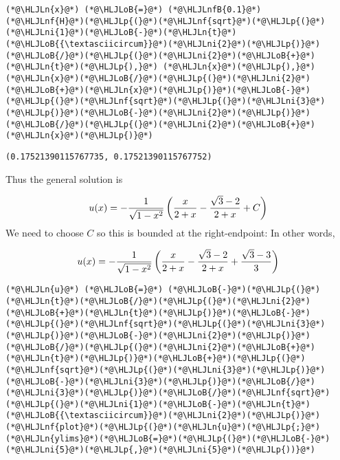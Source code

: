 \documentclass[12pt,a4paper]{article}
\newcommand{\HLJLn}[1]{#1}
\newcommand{\HLJLnf}[1]{\textcolor[RGB]{66,102,213}{#1}}
\newcommand{\HLJLnfB}[1]{\textcolor[RGB]{59,151,46}{#1}}
\newcommand{\HLJLni}[1]{\textcolor[RGB]{59,151,46}{#1}}
\newcommand{\HLJLoB}[1]{\textcolor[RGB]{102,102,102}{\textbf{#1}}}
\newcommand{\HLJLp}[1]{#1}
\begin{document}
\begin{lstlisting}
(*@\HLJLn{x}@*) (*@\HLJLoB{=}@*) (*@\HLJLnfB{0.1}@*)
(*@\HLJLnf{H}@*)(*@\HLJLp{(}@*)(*@\HLJLnf{sqrt}@*)(*@\HLJLp{(}@*)(*@\HLJLni{1}@*)(*@\HLJLoB{-}@*)(*@\HLJLn{t}@*)(*@\HLJLoB{{\textasciicircum}}@*)(*@\HLJLni{2}@*)(*@\HLJLp{)}@*)(*@\HLJLoB{/}@*)(*@\HLJLp{(}@*)(*@\HLJLni{2}@*)(*@\HLJLoB{+}@*)(*@\HLJLn{t}@*)(*@\HLJLp{),}@*) (*@\HLJLn{x}@*)(*@\HLJLp{),}@*) (*@\HLJLn{x}@*)(*@\HLJLoB{/}@*)(*@\HLJLp{(}@*)(*@\HLJLni{2}@*)(*@\HLJLoB{+}@*)(*@\HLJLn{x}@*)(*@\HLJLp{)}@*)(*@\HLJLoB{-}@*)(*@\HLJLp{(}@*)(*@\HLJLnf{sqrt}@*)(*@\HLJLp{(}@*)(*@\HLJLni{3}@*)(*@\HLJLp{)}@*)(*@\HLJLoB{-}@*)(*@\HLJLni{2}@*)(*@\HLJLp{)}@*)(*@\HLJLoB{/}@*)(*@\HLJLp{(}@*)(*@\HLJLni{2}@*)(*@\HLJLoB{+}@*)(*@\HLJLn{x}@*)(*@\HLJLp{)}@*)
\end{lstlisting}

\begin{lstlisting}
(0.17521390115767735, 0.17521390115767752)
\end{lstlisting}


Thus the general solution is

\[
u(x) = -{1 \over \sqrt{1-x^2}} \left( {x\over 2+x} -{ \sqrt{3} -2 \over 2+x} + C \right)
\]
We need to choose $C$ so this is bounded at the right-endpoint: In other words,

\[
u(x) = -{1 \over \sqrt{1-x^2}} \left( {x\over 2+x} -{ \sqrt{3} -2 \over 2+x} +{ \sqrt{3} -3 \over 3}  \right)
\]

\begin{lstlisting}
(*@\HLJLn{u}@*) (*@\HLJLoB{=}@*) (*@\HLJLoB{-}@*)(*@\HLJLp{(}@*)(*@\HLJLn{t}@*)(*@\HLJLoB{/}@*)(*@\HLJLp{(}@*)(*@\HLJLni{2}@*)(*@\HLJLoB{+}@*)(*@\HLJLn{t}@*)(*@\HLJLp{)}@*)(*@\HLJLoB{-}@*)(*@\HLJLp{(}@*)(*@\HLJLnf{sqrt}@*)(*@\HLJLp{(}@*)(*@\HLJLni{3}@*)(*@\HLJLp{)}@*)(*@\HLJLoB{-}@*)(*@\HLJLni{2}@*)(*@\HLJLp{)}@*)(*@\HLJLoB{/}@*)(*@\HLJLp{(}@*)(*@\HLJLni{2}@*)(*@\HLJLoB{+}@*)(*@\HLJLn{t}@*)(*@\HLJLp{)}@*)(*@\HLJLoB{+}@*)(*@\HLJLp{(}@*)(*@\HLJLnf{sqrt}@*)(*@\HLJLp{(}@*)(*@\HLJLni{3}@*)(*@\HLJLp{)}@*)(*@\HLJLoB{-}@*)(*@\HLJLni{3}@*)(*@\HLJLp{)}@*)(*@\HLJLoB{/}@*)(*@\HLJLni{3}@*)(*@\HLJLp{)}@*)(*@\HLJLoB{/}@*)(*@\HLJLnf{sqrt}@*)(*@\HLJLp{(}@*)(*@\HLJLni{1}@*)(*@\HLJLoB{-}@*)(*@\HLJLn{t}@*)(*@\HLJLoB{{\textasciicircum}}@*)(*@\HLJLni{2}@*)(*@\HLJLp{)}@*)
(*@\HLJLnf{plot}@*)(*@\HLJLp{(}@*)(*@\HLJLn{u}@*)(*@\HLJLp{;}@*) (*@\HLJLn{ylims}@*)(*@\HLJLoB{=}@*)(*@\HLJLp{(}@*)(*@\HLJLoB{-}@*)(*@\HLJLni{5}@*)(*@\HLJLp{,}@*)(*@\HLJLni{5}@*)(*@\HLJLp{))}@*)
\end{lstlisting}
\end{document}
